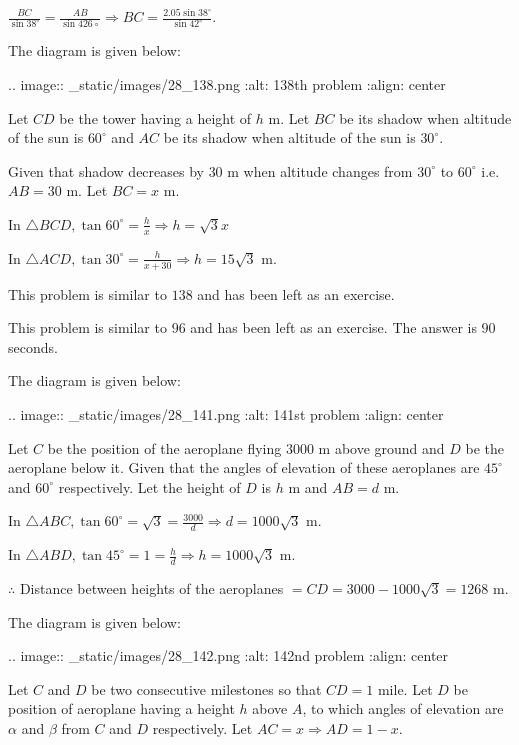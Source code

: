   $\frac{BC}{\sin38^\circ} = \frac{AB}{\sin426\circ}\Rightarrow BC =
  \frac{2.05\sin38^\circ}{\sin42^\circ}$.

\item The diagram is given below:

  .. image:: _static/images/28_138.png
  :alt: 138th problem
  :align: center

  Let $CD$ be the tower having a height of $h$ m. Let $BC$ be its shadow when altitude
  of the sun is $60^\circ$ and $AC$ be its shadow when altitude of the sun is
  $30^\circ$.

  Given that shadow decreases by $30$ m when altitude changes from $30^\circ$ to
  $60^\circ$ i.e. $AB = 30$ m. Let $BC = x$ m.

  In $\triangle BCD, \tan60^\circ = \frac{h}{x} \Rightarrow h = \sqrt{3}x$

  In $\triangle ACD, \tan30^\circ = \frac{h}{x + 30} \Rightarrow h = 15\sqrt{3}$ m.

\item This problem is similar to $138$ and has been left as an exercise.

\item This problem is similar to $96$ and has been left as an exercise. The answer is $90$ seconds.

\item The diagram is given below:

  .. image:: _static/images/28_141.png
  :alt: 141st problem
  :align: center

  Let $C$ be the position of the aeroplane flying $3000$ m above ground and $D$ be the
  aeroplane below it. Given that the angles of elevation of these aeroplanes are $45^\circ$ and
  $60^\circ$ respectively. Let the height of $D$ is $h$ m and $AB = d$ m.

  In $\triangle ABC, \tan60^\circ = \sqrt{3} = \frac{3000}{d} \Rightarrow d = 1000\sqrt{3}$ m.

  In $\triangle ABD, \tan45^\circ = 1 = \frac{h}{d} \Rightarrow h = 1000\sqrt{3}$ m.

  $\therefore$ Distance between heights of the aeroplanes $= CD = 3000 - 1000\sqrt{3} =
  1268$ m.

\item The diagram is given below:

  .. image:: _static/images/28_142.png
  :alt: 142nd problem
  :align: center

  Let $C$ and $D$ be two consecutive milestones so that $CD = 1$ mile. Let $D$ be
  position of aeroplane having a height $h$ above $A$, to which angles of elevation are
  $\alpha$ and $\beta$ from $C$ and $D$ respectively. Let $AC = x
  \Rightarrow AD = 1 - x$.

